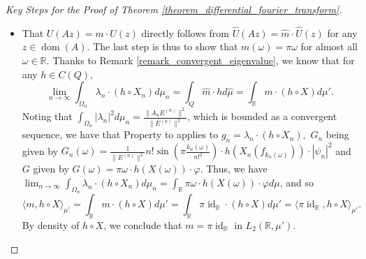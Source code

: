 \documentclass{amsart}
\theoremstyle{definition}
\theoremstyle{remark}
\def \Dom{\operatorname{dom}}
\def \Id{\operatorname{id}}
\def \HMU{\hat{\mu}}
\def \HU{\hat{U}}
\def \Hm{\hat{m}}
\def \LL{\langle}
\def \RR{\rangle}
\begin{document}
\begin{proof}[Key Steps for the Proof of Theorem \ref{theorem_differential_fourier_transform}]
\begin{itemize}
		\item That $U(Az)=m\cdot U(z)$ directly follows from $\HU(Az)=\Hm\cdot\HU(z)$ for any $z\in\Dom(A).$ The last step is thus to show that $m(\omega)=\pi\omega$ for almost all $\omega\in\mathbb{R}.$ Thanks to Remark \ref{remark_convergent_eigenvalue}, we know that for any $h\in C(Q),$ $$\lim_{n\rightarrow\infty} \int_{\Omega_n}\lambda_n\cdot (h\circ X_n)d\mu_n=\int_Q \Hm\cdot hd\HMU=\int_{\mathbb{R}}m\cdot (h\circ X) d\mu'.$$ Noting that $\int_{\Omega_n}|\lambda_n|^2d\mu_n=\frac{\|A_n E^{(n)}\|^2}{\|E^{(n)}\|^2}$, which is bounded as a convergent sequence, we have that Property to applies to $g_n=\lambda_n\cdot (h\circ X_n),$ $G_n$ being given by $G_n(\omega)=\frac{1}{\|E^{(n)}\|^2}n! \sin(\pi\frac{k_n(\omega)}{n!^2})\cdot h(X_n(f_{k_n(\omega)}))\cdot|\psi_n|^2$ and $G$ given by $G(\omega)=\pi\omega \cdot h(X(\omega))\cdot\varphi.$ Thus, we have $\lim_{n\rightarrow\infty} \int_{\Omega_n}\lambda_n\cdot (h\circ X_n)d\mu_n=\int_{\mathbb{R}}\pi\omega\cdot h(X(\omega))\cdot\varphi d\mu$, and so $$\LL m, h\circ X\RR_{\mu'}=\int_{\mathbb{R}}m\cdot (h\circ X) d\mu'=\int_{\mathbb{R}}\pi\Id_{\mathbb{R}}\cdot (h\circ X)d\mu'=\LL \pi\Id_{\mathbb{R}}, h\circ X \RR_{\mu'}. $$ By density of $h\circ X$, we conclude that $m=\pi\Id_{\mathbb{R}}$ in $L_2(\mathbb{R},\mu').$%
	\end{itemize}
\end{proof}
\end{document}
